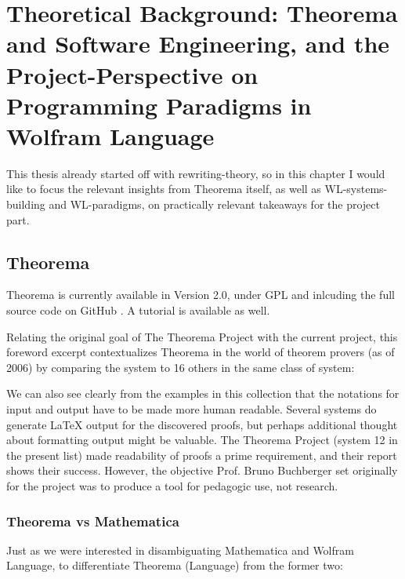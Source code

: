 \chapter[Theoretical Background]{Theoretical Background: Theorema and Software Engineering, and the Project-Perspective on Programming Paradigms in Wolfram Language}
\label{cha:Theory}

This thesis already started off with rewriting-theory, so in this chapter I would like to focus the relevant insights from Theorema itself, as well as WL-systems-building and WL-paradigms, on practically relevant takeaways for the project part.

\section{Theorema} \label{tma}

Theorema is currently available in Version 2.0, under GPL \cite{noauthor_httpswww3riscjkuatresearchtheoremasoftware_nodate} and inlcuding the full source code on GitHub \cite{noauthor_github_nodate}. A tutorial is available as well. \cite{windsteiger_theorema_2017}

Relating the original goal of The Theorema Project with the current project, this foreword excerpt contextualizes Theorema in the world of theorem provers (as of 2006) by comparing the system to 16 others in the same class of system:

\begin{displayquote}
We can also see clearly from the examples in this collection that the notations
for input and output have to be made more human readable. Several systems do
generate LaTeX output for the discovered proofs, but perhaps additional thought
about formatting output might be valuable. The Theorema Project (system 12
in the present list) made readability of proofs a prime requirement, and their
report shows their success. However, the objective Prof. Bruno Buchberger set
originally for the project was to produce a tool for pedagogic use, not research.
\cite[p. 4]{g_mayrhofer_s_saminger__w_winsteiger_theorema_nodate}
\end{displayquote}

\subsection{Theorema vs Mathematica}

Just as we were interested in disambiguating Mathematica and Wolfram Language, to differentiate Theorema (Language) from the former two:

